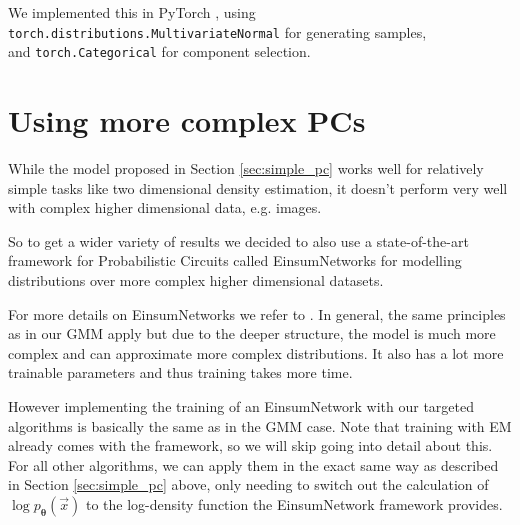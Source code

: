 We implemented this in PyTorch \cite{pytorch}, using \\
\texttt{torch.distributions.MultivariateNormal} for generating samples,\\
and \texttt{torch.Categorical} for component selection.

\section{Using more complex PCs}

While the model proposed in Section \ref{sec:simple_pc} works well for relatively simple tasks like two dimensional density estimation,
it doesn't perform very well with complex higher dimensional data, e.g. images. 

So to get a wider variety of results we decided to also use a state-of-the-art framework for Probabilistic Circuits called 
EinsumNetworks \cite{einsum} for modelling distributions over more complex higher dimensional datasets. 

For more details on EinsumNetworks we refer to \cite{einsum}. In general, the same 
principles as in our GMM apply but due to the deeper structure, the model is much more complex and can approximate more complex distributions. 
It also has a lot more trainable parameters and thus training takes more time. 

However implementing the training of an EinsumNetwork with our targeted algorithms is basically the same 
as in the GMM case. Note that training with EM already comes with the framework, so we will skip going into detail about this. \\
For all other algorithms, we can apply them in the exact same way as described in Section \ref{sec:simple_pc} above, only needing 
to switch out the calculation of $\log p_{\boldsymbol{\theta}}(\vec x)$ to the log-density function the EinsumNetwork framework provides. 
